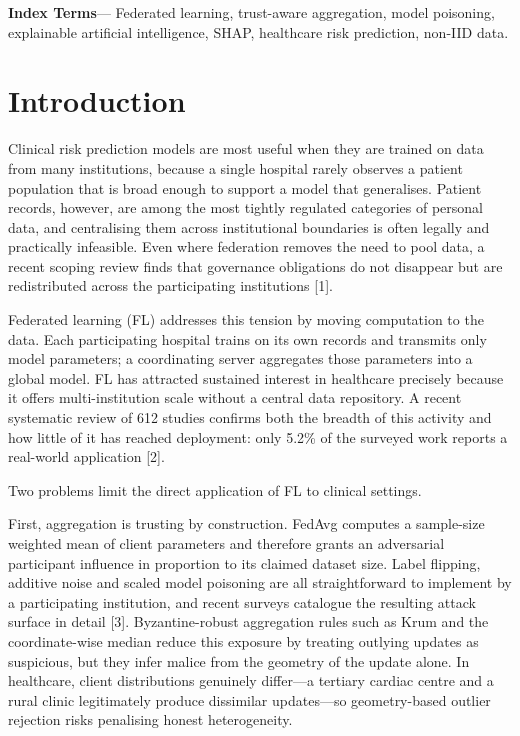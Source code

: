 \documentclass[10pt,twocolumn,letterpaper]{article}
\begin{document}
\textbf{Index Terms}---
Federated learning, trust-aware aggregation, model poisoning, explainable
artificial intelligence, SHAP, healthcare risk prediction, non-IID data.


\section{Introduction}

Clinical risk prediction models are most useful when they are trained on
data from many institutions, because a single hospital rarely observes a
patient population that is broad enough to support a model that generalises.
Patient records, however, are among the most tightly regulated categories of
personal data, and centralising them across institutional boundaries is often
legally and practically infeasible. Even where federation removes the need to
pool data, a recent scoping review finds that governance obligations do not
disappear but are redistributed across the participating
institutions [1].

Federated learning (FL) addresses this tension by moving computation to the
data. Each participating hospital trains on
its own records and transmits only model parameters; a coordinating server
aggregates those parameters into a global model. FL has attracted sustained
interest in healthcare precisely because it offers multi-institution scale
without a central data repository. A recent systematic review of 612 studies confirms both the breadth of this activity and how little of it has reached deployment: only 5.2\% of the surveyed work reports a real-world application [2].

Two problems limit the direct application of FL to clinical settings.

First, aggregation is trusting by construction. FedAvg
computes a sample-size weighted mean of client parameters and therefore
grants an adversarial participant influence in proportion to its claimed
dataset size. Label flipping, additive noise and scaled model poisoning are
all straightforward to implement by a participating institution, and recent surveys catalogue the resulting attack surface in detail [3]. Byzantine-robust aggregation
rules such as Krum and the coordinate-wise median
 reduce this exposure by treating outlying updates as
suspicious, but they infer malice from the geometry of the update alone. In
healthcare, client distributions genuinely differ---a tertiary cardiac centre
and a rural clinic legitimately produce dissimilar updates---so
geometry-based outlier rejection risks penalising honest heterogeneity.
\end{document}
